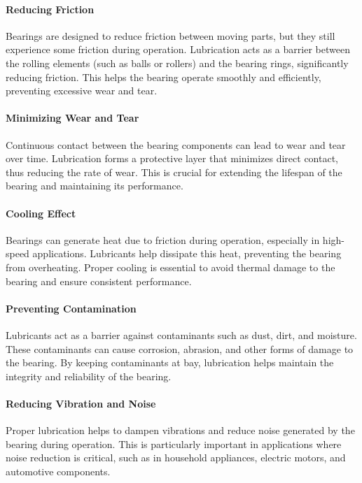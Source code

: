 \documentclass[../../main]{subfiles}
\begin{document}
\paragraph{Reducing Friction}
Bearings are designed to reduce friction between moving parts, but they still experience some friction during operation. Lubrication acts as a barrier between the rolling elements (such as balls or rollers) and the bearing rings, significantly reducing friction. This helps the bearing operate smoothly and efficiently, preventing excessive wear and tear.

\paragraph{Minimizing Wear and Tear}
Continuous contact between the bearing components can lead to wear and tear over time. Lubrication forms a protective layer that minimizes direct contact, thus reducing the rate of wear. This is crucial for extending the lifespan of the bearing and maintaining its performance.

\paragraph{Cooling Effect}
Bearings can generate heat due to friction during operation, especially in high-speed applications. Lubricants help dissipate this heat, preventing the bearing from overheating. Proper cooling is essential to avoid thermal damage to the bearing and ensure consistent performance.

\paragraph{Preventing Contamination}
Lubricants act as a barrier against contaminants such as dust, dirt, and moisture. These contaminants can cause corrosion, abrasion, and other forms of damage to the bearing. By keeping contaminants at bay, lubrication helps maintain the integrity and reliability of the bearing.

\paragraph{Reducing Vibration and Noise}
Proper lubrication helps to dampen vibrations and reduce noise generated by the bearing during operation. This is particularly important in applications where noise reduction is critical, such as in household appliances, electric motors, and automotive components.
\end{document}
